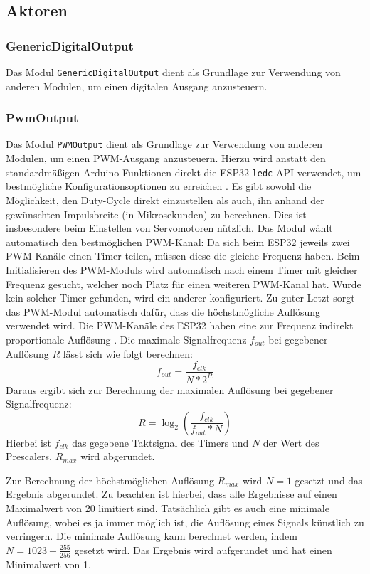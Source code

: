 \subsection{Aktoren}
\subsubsection{GenericDigitalOutput}
Das Modul \texttt{GenericDigitalOutput} dient als Grundlage zur Verwendung von anderen Modulen,
um einen digitalen Ausgang anzusteuern.

\subsubsection{PwmOutput}
Das Modul \texttt{PWMOutput} dient als Grundlage zur Verwendung von anderen Modulen,
um einen PWM-Ausgang anzusteuern.
%
Hierzu wird anstatt den standardmäßigen Arduino-Funktionen
direkt die ESP32 \texttt{ledc}-API verwendet,
um bestmögliche Konfigurationsoptionen zu erreichen \cite{esp32-ledc}. %
%
Es gibt sowohl die Möglichkeit,
den Duty-Cycle direkt einzustellen als auch,
ihn anhand der gewünschten Impulsbreite (in Mikrosekunden) zu berechnen.
%
Dies ist insbesondere beim Einstellen von Servomotoren nützlich.
%
Das Modul wählt automatisch den bestmöglichen PWM-Kanal:
%
Da sich beim ESP32 jeweils zwei PWM-Kanäle einen Timer teilen,
müssen diese die gleiche Frequenz haben.
%
Beim Initialisieren des PWM-Moduls wird automatisch nach einem Timer mit gleicher Frequenz gesucht,
welcher noch Platz für einen weiteren PWM-Kanal hat.
%
Wurde kein solcher Timer gefunden,
wird ein anderer konfiguriert.
%
Zu guter Letzt sorgt das PWM-Modul automatisch dafür,
dass die höchstmögliche Auflösung verwendet wird.
%
Die PWM-Kanäle des ESP32 haben eine zur Frequenz indirekt proportionale Auflösung \cite{esp32-technical-reference}.
Die maximale Signalfrequenz $f_{out}$ bei gegebener Auflösung $R$ lässt sich wie folgt berechnen:
\begin{equation}
    f_{out} = \frac{f_{clk}}{N*2^{R}}
\end{equation}
Daraus ergibt sich zur Berechnung der maximalen Auflösung bei gegebener Signalfrequenz:
\begin{equation}
    R = \log_2\left( \frac{f_{clk}}{f_{out}*N} \right)
\end{equation}
Hierbei ist $f_{clk}$ das gegebene Taktsignal des Timers und $N$ der Wert des Prescalers.
%
$R_{max}$ wird abgerundet.

Zur Berechnung der höchstmöglichen Auflösung $R_{max}$ wird $N=1$ gesetzt und das Ergebnis abgerundet.
%
Zu beachten ist hierbei,
dass alle Ergebnisse auf einen Maximalwert von 20 limitiert sind.
%
Tatsächlich gibt es auch eine minimale Auflösung,
wobei es ja immer möglich ist,
die Auflösung eines Signals künstlich zu verringern.
%
Die minimale Auflösung kann berechnet werden, indem $N=1023+\frac{255}{256}$ gesetzt wird.
Das Ergebnis wird aufgerundet und hat einen Minimalwert von 1.

